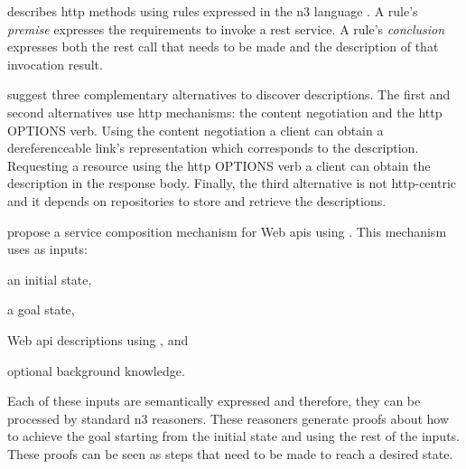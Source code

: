 \restdesc{} describes \acs{http} methods using rules expressed in the \ac{n3} language .
A rule's \emph{premise} expresses the requirements to invoke a \ac{rest} service.
A rule's \emph{conclusion} expresses both the \ac{rest} call that needs to be made and the description of that invocation result.


\citet{verborgh_functional_2012} suggest three complementary alternatives to discover descriptions.
The first and second alternatives use \ac{http} mechanisms: the content negotiation and the \ac{http} OPTIONS verb.
Using the content negotiation a client can obtain a dereferenceable link's representation which corresponds to the description. %
Requesting a resource using the \ac{http} OPTIONS verb a client can obtain the description in the response body.
Finally, the third alternative is not \ac{http}-centric and it depends on repositories to store and retrieve the descriptions.


\citet{verborgh_ijcs_2014} propose a service composition mechanism for Web \acp{api} using \restdesc{}.
This mechanism uses as inputs:
\begin{enumerate*}[label=\itshape(\arabic*\upshape)]
  \item an initial state,
  \item a goal state,
  \item Web \ac{api} descriptions using \restdesc{}, and
  \item optional background knowledge.
\end{enumerate*}
Each of these inputs are semantically expressed and therefore, they can be processed by standard \ac{n3} reasoners.
These reasoners generate proofs about how to achieve the goal starting from the initial state and using the rest of the inputs.
These proofs can be seen as steps that need to be made to reach a desired state.


